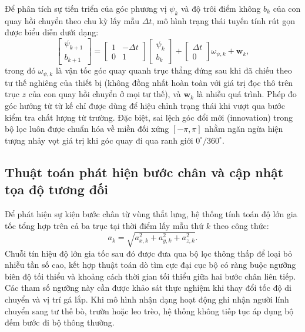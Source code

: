 Để phân tích sự tiến triển của góc phương vị $\psi_k$ và độ trôi điểm không $b_k$ của con quay hồi chuyển theo chu kỳ lấy mẫu $\Delta t$, mô hình trạng thái tuyến tính rút gọn được biểu diễn dưới dạng:
\begin{equation}
\begin{bmatrix}\psi_{k+1}\\b_{k+1}\end{bmatrix}
=\begin{bmatrix}1&-\Delta t\\0&1\end{bmatrix}
\begin{bmatrix}\psi_k\\b_k\end{bmatrix}
+\begin{bmatrix}\Delta t\\0\end{bmatrix}\omega_{\psi,k}+\boldsymbol w_k,
\end{equation}
trong đó $\omega_{\psi,k}$ là vận tốc góc quay quanh trục thẳng đứng sau khi đã chiếu theo tư thế nghiêng của thiết bị (không đồng nhất hoàn toàn với giá trị đọc thô trên trục $z$ của con quay hồi chuyển ở mọi tư thế), và $\boldsymbol w_k$ là nhiễu quá trình. Phép đo góc hướng từ từ kế chỉ được dùng để hiệu chỉnh trạng thái khi vượt qua bước kiểm tra chất lượng từ trường. Đặc biệt, sai lệch góc đổi mới (innovation) trong bộ lọc luôn được chuẩn hóa về miền đối xứng $[-\pi, \pi]$ nhằm ngăn ngừa hiện tượng nhảy vọt giá trị khi góc quay đi qua ranh giới $0^\circ/360^\circ$.

\subsection{Thuật toán phát hiện bước chân và cập nhật tọa độ tương đối}
Để phát hiện sự kiện bước chân từ vùng thắt lưng, hệ thống tính toán độ lớn gia tốc tổng hợp trên cả ba trục tại thời điểm lấy mẫu thứ $k$ theo công thức:
\begin{equation}
a_k=\sqrt{a_{x,k}^2+a_{y,k}^2+a_{z,k}^2}.
\end{equation}
Chuỗi tín hiệu độ lớn gia tốc sau đó được đưa qua bộ lọc thông thấp để loại bỏ nhiễu tần số cao, kết hợp thuật toán dò tìm cực đại cục bộ có ràng buộc ngưỡng biên độ tối thiểu và khoảng cách thời gian tối thiểu giữa hai bước chân liên tiếp. Các tham số ngưỡng này cần được khảo sát thực nghiệm khi thay đổi tốc độ di chuyển và vị trí gá lắp. Khi mô hình nhận dạng hoạt động ghi nhận người lính chuyển sang tư thế bò, trườn hoặc leo trèo, hệ thống không tiếp tục áp dụng bộ đếm bước đi bộ thông thường.

